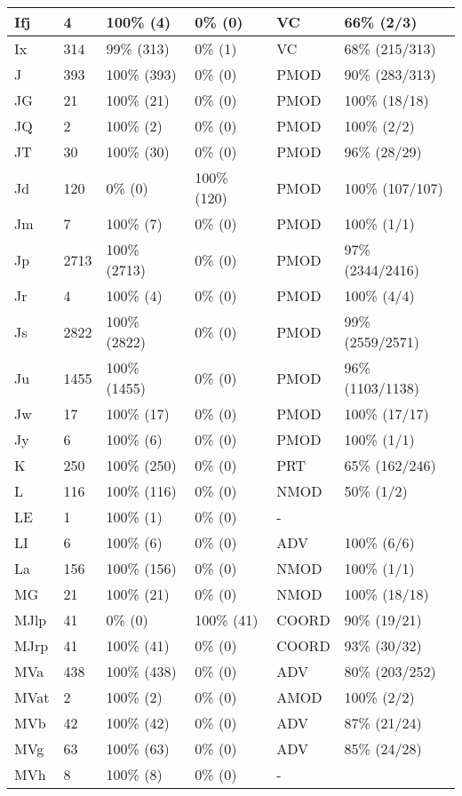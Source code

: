 \begin{figure*}
\begin{tabular}{|l|l|l|l||l|l|}
\hline
 Ifj & 4 & 100\% (4) & 0\% (0) & VC & 66\% (2/3) \\ 
\hline
 Ix & 314 & 99\% (313) & 0\% (1) & VC & 68\% (215/313) \\ 
\hline
 J & 393 & 100\% (393) & 0\% (0) & PMOD & 90\% (283/313) \\ 
\hline
 JG & 21 & 100\% (21) & 0\% (0) & PMOD & 100\% (18/18) \\ 
\hline
 JQ & 2 & 100\% (2) & 0\% (0) & PMOD & 100\% (2/2) \\ 
\hline
 JT & 30 & 100\% (30) & 0\% (0) & PMOD & 96\% (28/29) \\ 
\hline
 Jd & 120 & 0\% (0) & 100\% (120) & PMOD & 100\% (107/107) \\ 
\hline
 Jm & 7 & 100\% (7) & 0\% (0) & PMOD & 100\% (1/1) \\ 
\hline
 Jp & 2713 & 100\% (2713) & 0\% (0) & PMOD & 97\% (2344/2416) \\ 
\hline
 Jr & 4 & 100\% (4) & 0\% (0) & PMOD & 100\% (4/4) \\ 
\hline
 Js & 2822 & 100\% (2822) & 0\% (0) & PMOD & 99\% (2559/2571) \\ 
\hline
 Ju & 1455 & 100\% (1455) & 0\% (0) & PMOD & 96\% (1103/1138) \\ 
\hline
 Jw & 17 & 100\% (17) & 0\% (0) & PMOD & 100\% (17/17) \\ 
\hline
 Jy & 6 & 100\% (6) & 0\% (0) & PMOD & 100\% (1/1) \\ 
\hline
 K & 250 & 100\% (250) & 0\% (0) & PRT & 65\% (162/246) \\ 
\hline
 L & 116 & 100\% (116) & 0\% (0) & NMOD & 50\% (1/2) \\ 
\hline
 LE & 1 & 100\% (1) & 0\% (0) & - &  \\ 
\hline
 LI & 6 & 100\% (6) & 0\% (0) & ADV & 100\% (6/6) \\ 
\hline
 La & 156 & 100\% (156) & 0\% (0) & NMOD & 100\% (1/1) \\ 
\hline
 MG & 21 & 100\% (21) & 0\% (0) & NMOD & 100\% (18/18) \\ 
\hline
 MJlp & 41 & 0\% (0) & 100\% (41) & COORD & 90\% (19/21) \\ 
\hline
 MJrp & 41 & 100\% (41) & 0\% (0) & COORD & 93\% (30/32) \\ 
\hline
 MVa & 438 & 100\% (438) & 0\% (0) & ADV & 80\% (203/252) \\ 
\hline
 MVat & 2 & 100\% (2) & 0\% (0) & AMOD & 100\% (2/2) \\ 
\hline
 MVb & 42 & 100\% (42) & 0\% (0) & ADV & 87\% (21/24) \\ 
\hline
 MVg & 63 & 100\% (63) & 0\% (0) & ADV & 85\% (24/28) \\ 
\hline
 MVh & 8 & 100\% (8) & 0\% (0) & - &  \\ 
\hline
\end{tabular}
\end{figure*}
